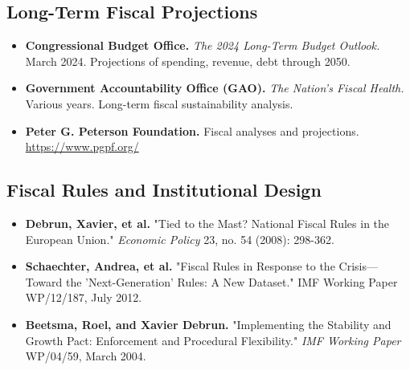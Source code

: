 \documentclass[12pt,letterpaper]{article}
\begin{document}
\subsection{Long-Term Fiscal Projections}

\begin{itemize}
    \item \textbf{Congressional Budget Office.} \textit{The 2024 Long-Term Budget Outlook.} March 2024. Projections of spending, revenue, debt through 2050.

    \item \textbf{Government Accountability Office (GAO).} \textit{The Nation's Fiscal Health.} Various years. Long-term fiscal sustainability analysis.

    \item \textbf{Peter G. Peterson Foundation.} Fiscal analyses and projections. \url{https://www.pgpf.org/}
\end{itemize}

\subsection{Fiscal Rules and Institutional Design}

\begin{itemize}
    \item \textbf{Debrun, Xavier, et al.} "Tied to the Mast? National Fiscal Rules in the European Union." \textit{Economic Policy} 23, no. 54 (2008): 298-362.

    \item \textbf{Schaechter, Andrea, et al.} "Fiscal Rules in Response to the Crisis—Toward the 'Next-Generation' Rules: A New Dataset." IMF Working Paper WP/12/187, July 2012.

    \item \textbf{Beetsma, Roel, and Xavier Debrun.} "Implementing the Stability and Growth Pact: Enforcement and Procedural Flexibility." \textit{IMF Working Paper} WP/04/59, March 2004.
\end{itemize}
\end{document}
